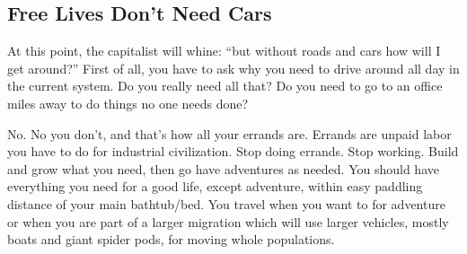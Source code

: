 \subsection{Free Lives Don't Need Cars}\label{free-lives-dont-need-cars}

At this point, the capitalist will whine: ``but without roads and cars
how will I get around?'' First of all, you have to ask why you need to
drive around all day in the current system. Do you really need all that?
Do you need to go to an office miles away to do things no one needs
done?

No. No you don't, and that's how all your errands are. Errands are
unpaid labor you have to do for industrial civilization. Stop doing
errands. Stop working. Build and grow what you need, then go have
adventures as needed. You should have everything you need for a good
life, except adventure, within easy paddling distance of your main
bathtub/bed. You travel when you want to for adventure or when you are
part of a larger migration which will use larger vehicles, mostly boats
and giant spider pods, for moving whole populations.
